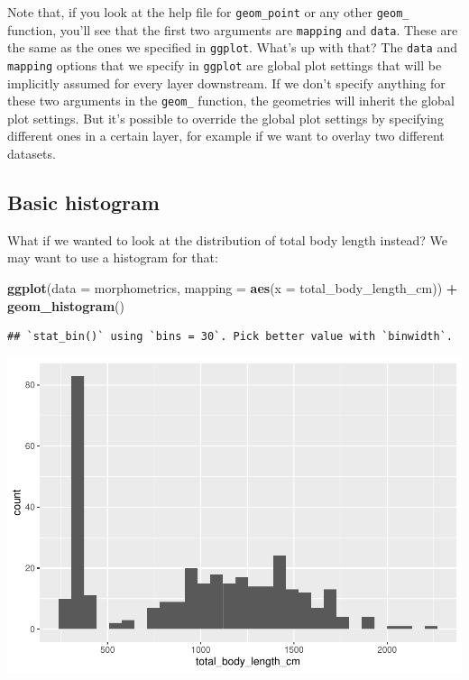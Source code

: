 \documentclass[
]{book}
\newenvironment{Shaded}{\begin{snugshade}}{\end{snugshade}}
\newcommand{\AttributeTok}[1]{\textcolor[rgb]{0.13,0.29,0.53}{#1}}
\newcommand{\FunctionTok}[1]{\textcolor[rgb]{0.13,0.29,0.53}{\textbf{#1}}}
\newcommand{\NormalTok}[1]{#1}
\newcommand{\SpecialCharTok}[1]{\textcolor[rgb]{0.81,0.36,0.00}{\textbf{#1}}}
\begin{document}
Note that, if you look at the help file for \texttt{geom\_point} or any other \texttt{geom\_}
function, you'll see that the first two arguments are \texttt{mapping} and \texttt{data}.
These are the same as the ones we specified in \texttt{ggplot}. What's up with that?
The \texttt{data} and \texttt{mapping} options that we specify in \texttt{ggplot} are global plot
settings that will be implicitly assumed for every layer downstream. If we don't
specify anything for these two arguments in the \texttt{geom\_} function, the geometries
will inherit the global plot settings. But it's possible to override the global
plot settings by specifying different ones in a certain layer, for example if
we want to overlay two different datasets.

\hypertarget{basic-histogram}{%
\subsection{Basic histogram}\label{basic-histogram}}

What if we wanted to look at the distribution of total body length instead? We
may want to use a histogram for that:

\begin{Shaded}
\begin{Highlighting}[]
\FunctionTok{ggplot}\NormalTok{(}\AttributeTok{data =}\NormalTok{ morphometrics, }
       \AttributeTok{mapping =} \FunctionTok{aes}\NormalTok{(}\AttributeTok{x =}\NormalTok{ total\_body\_length\_cm)) }\SpecialCharTok{+}
  \FunctionTok{geom\_histogram}\NormalTok{()}
\end{Highlighting}
\end{Shaded}

\begin{verbatim}
## `stat_bin()` using `bins = 30`. Pick better value with `binwidth`.
\end{verbatim}

\includegraphics{reproducible-science_files/figure-latex/gg4-1.pdf}
\end{document}
